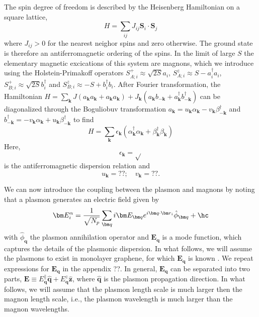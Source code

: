 The spin degree of freedom is described by the Heisenberg Hamiltonian on a square lattice, 
\begin{equation}
	H = \sum_{ij} J_{ij}\bm S_i \cdot \bm S_j 
\end{equation}
where $J_{ij}>0$ for the nearest neighor spins and zero otherwise. The ground state is therefore an antiferromagnetic ordering of the spins. In the limit of large $S$ the elementary magnetic excications of this system are magnons, which we introduce using the Holstein-Primakoff operators $S_{A;i}^+ \approx \sqrt{2S} a_i $, $S_{A;i}^z\approx S- a_i^\dagger a_i$, $S_{B;i}^+ \approx\sqrt{2S}  b_i^\dagger $ and $S_{B;i}^z\approx -S+ b_i^\dagger b_i$. After Fourier transformation, the Hamiltonian $H=\sum_{\bm k} J(a_{\bm k}a_{\bm k}+a_{\bm k}a_{\bm k})+J_{\bm k}(a_{\bm k}b_{-\bm k} + a_{\bm k}^\dagger b_{-\bm k}^\dagger)$ can be diagonalized through the Boguliobuv transformation $a_{\bm k} = u_{\bm k} \alpha_{\bm k} - v_{\bm k} \beta_{-\bm k}^\dagger$ and $b^\dagger_{-\bm k} = -v_{\bm k} \alpha_{\bm k} + u_{\bm k} \beta_{-\bm k}^\dagger$ to find
\begin{equation}
	H=\sum_{\bm k} \epsilon_{\bm k} \left( \alpha_{\bm k}^\dagger \alpha_{\bm k} + \beta_{\bm k}^\dagger\beta_{\bm k} \right)
\end{equation}
Here, 
\begin{equation}
	\epsilon_{\bm k} =  \sqrt{}\label{eq:dispersion-afm-square}
\end{equation}
is the antiferromagnetic dispersion relation and 
\begin{equation}
	u_{\bm k} = ??;\quad v_{\bm k}=??. \label{eq:bog-factors}
\end{equation}

We can now introduce the coupling between the plasmon and magnons by noting that a plasmon generates an electric field given by
\begin{equation}
	\bm E_i^\alpha = \frac{1}{\sqrt{N_p}}\sum_{\bm q} i \bm E_{\bm q} e^{i\bm q \cdot \bm r_i} \hat\phi_{\bm q} + \hc
\end{equation}
with $\hat\phi_{\bm q}$ the plasmon annihilation operator and $\bm E_{\bm q}$ is a mode function, which captures the details of the plasmonic dispersion. In what follows, we will assume the plasmons to exist in monolayer graphene, for which $\bm E_{\bm q}$ is known \cite{ferreira}. We repeat expressions for $\bm E_{\bm q}$ in the appendix ??. In general, $\bm E_{\bm q}$ can be separated into two parts, $\bm E\equiv E_{\bm q}^\parallel \hat{\bm q} + E_{\bm q}^z \hat{\bm z}$, where $\hat{\bm q}$ is the plasmon propagation direction. In what follows, we will assume that the plasmon length scale is much larger then the magnon length scale, i.e., the plasmon wavelength is much larger than the magnon wavelengths.  



